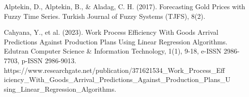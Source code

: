 \documentclass[conference]{IEEEtran}
\begin{document}
\begin{thebibliography}{00}
 Alptekin, D., Alptekin, B., \& Aladag, C. H. (2017). Forecasting Gold Prices with Fuzzy Time Series. Turkish Journal of Fuzzy Systems (TJFS), 8(2).

 Cahyana, Y., et al. (2023). Work Process Efficiency With Goods Arrival Predictions Against Production Plans Using Linear Regression Algorithms. Edutran Computer Science \& Information Technology, 1(1), 9-18, e-ISSN 2986-7703, p-ISSN 2986-9013. https://www.researchgate.net/publication/371621534\_Work\_Process\_Eff\\iciency\_With\_Goods\_Arrival\_Predictions\_Against\_Production\_Plans\_U\\sing\_Linear\_Regression\_Algorithms.


\end{thebibliography}
\end{document}
